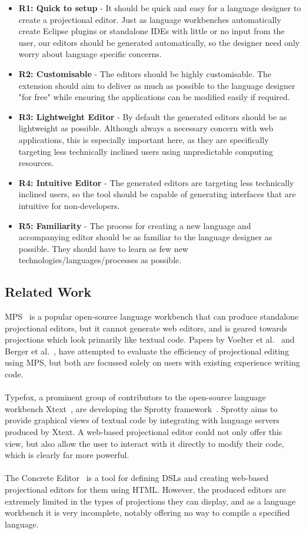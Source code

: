 \documentclass{article}
\begin{document}
\begin{itemize}
\item \textbf{R1: Quick to setup} - It should be quick and easy for a language designer to create a projectional editor. Just as language workbenches automatically create Eclipse plugins or standalone IDEs with little or no input from the user, our editors should be generated automatically, so the designer need only worry about language specific concerns.
\item \textbf{R2: Customisable} - The editors should be highly customisable. The extension should aim to deliver as much as possible to the language designer "for free" while ensuring the applications can be modified easily if required. 
\item \textbf{R3: Lightweight Editor} - By default the generated editors should be as lightweight as possible. Although always a necessary concern with web applications, this is especially important here, as they are specifically targeting less technically inclined users using unpredictable computing resources.
\item \textbf{R4: Intuitive Editor} - The generated editors are targeting less technically inclined users, so the tool should be capable of generating interfaces that are intuitive for non-developers.
\item \textbf{R5: Familiarity} - The process for creating a new language and accompanying editor should be as familiar to the language designer as possible. They should have to learn as few new technologies/languages/processes as possible.
\end{itemize}
\subsection{Related Work}
MPS~\cite{mps} is a popular open-source language workbench that can produce standalone projectional editors, but it cannot generate web editors, and is geared towards projections which look primarily like textual code. Papers by Voelter et al.~\cite{towardsUserFriendlyProjEditors} and Berger et al.~\cite{projEditControlledExperiment}, have attempted to evaluate the efficiency of projectional editing using MPS, but both are focussed solely on users with existing experience writing code.  
\\
\\
Typefox, a prominent group of contributors to the open-source language workbench Xtext~\cite{xtext}, are developing the Sprotty framework~\cite{sprotty}. Sprotty aims to provide graphical views of textual code by integrating with language servers produced by Xtext. A web-based projectional editor could not only offer this view, but also allow the user to interact with it directly to modify their code, which is clearly far more powerful.
\\
\\
The Concrete Editor~\cite{concrete} is a tool for defining DSLs and creating web-based projectional editors for them using HTML. However, the produced editors are extremely limited in the types of projections they can display, and as a language workbench it is very incomplete, notably offering no way to compile a specified language.
\end{document}
